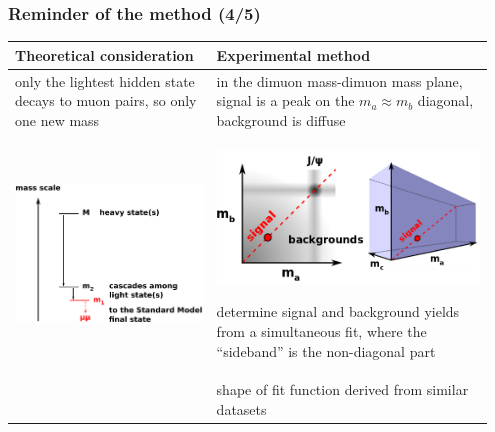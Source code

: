 \documentclass[compress]{beamer}
\begin{document}
\begin{frame}
\frametitle{Reminder of the method (4/5)}

\renewcommand{\arraystretch}{1.7}
\begin{tabular}{p{0.4\linewidth} | p{0.55\linewidth}}
Theoretical consideration & Experimental method \\\hline

only the lightest hidden state decays to muon pairs, so only one new mass & in the dimuon mass-dimuon mass plane, signal is a peak on the $m_a \approx m_b$ diagonal, background is diffuse \\

\includegraphics[width=\linewidth]{basic_picture4.pdf} & 
\includegraphics[width=\linewidth]{diagonal.png}

determine signal and background yields from a simultaneous fit, where the ``sideband'' is the non-diagonal part \\

& shape of fit function derived from similar datasets
\end{tabular}
\end{frame}
\end{document}
